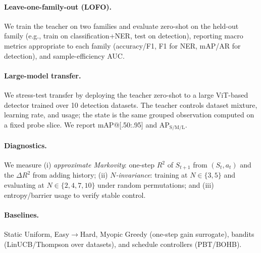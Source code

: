 \documentclass[11pt]{article}
\newcommand{\1}{\mathbf{1}}
\begin{document}
\paragraph{Leave-one-family-out (LOFO).}
We train the teacher on two families and evaluate zero-shot on the held-out family (e.g., train on classification+NER, test on detection), reporting macro metrics appropriate to each family (accuracy/F1, F1 for NER, mAP/AR for detection), and sample-efficiency AUC.

\paragraph{Large-model transfer.}
We stress-test transfer by deploying the teacher zero-shot to a large ViT-based detector trained over 10 detection datasets. 
The teacher controls dataset mixture, learning rate, and usage; the state is the same grouped observation computed on a fixed probe slice.
We report mAP@[.50:.95] and AP$_\mathrm{S/M/L}$.

\paragraph{Diagnostics.}
We measure (i) \emph{approximate Markovity}: one-step $R^2$ of $S_{t+1}$ from $(S_t,a_t)$ and the $\Delta R^2$ from adding history; (ii) \emph{$N$-invariance}: training at $N\in\{3,5\}$ and evaluating at $N\in\{2,4,7,10\}$ under random permutations; and (iii) entropy/barrier usage to verify stable control.

\paragraph{Baselines.}
Static Uniform, Easy$\to$Hard, Myopic Greedy (one-step gain surrogate), bandits (LinUCB/Thompson over datasets), and schedule controllers (PBT/BOHB).
\end{document}
